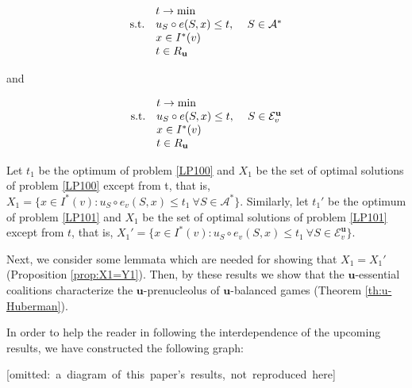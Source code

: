\documentclass[a4paper,12pt]{article}
\theoremstyle{definition}
\theoremstyle{remark}
\begin{document}
\begin{equation}\label{LP100}
\begin{array}{llr}
& t \to \min & \\
\textup{s.t.} & u_S \circ e(S, x) \leq t, & \ S \in \mathcal{A}^\ast \\
& x \in I^\ast (v) &  \\
& t \in R_{\mathbf{u}} & 
\end{array}
\end{equation}

\noindent and

\begin{equation}\label{LP101}
\begin{array}{llr}
& t \to \min & \\
\textup{s.t.} & u_S \circ e(S, x) \leq t, & \ S \in \mathcal{E}_v^\mathbf{u} \\
& x \in I^\ast (v) &  \\
& t \in R_{\mathbf{u}} & 
\end{array}
\end{equation}

Let $t_1$ be the optimum of problem \eqref{LP100} and $X_1$ be the set of optimal solutions of problem \eqref{LP100} except from t, that is, $X_1 = \{x\in I^\ast (v) \colon u_S \circ e_v (S,x) \leq t_1 \ \forall S\in \mathcal{A}^\ast \}$. Similarly, let $t_1'$ be the optimum of problem \eqref{LP101} and $X_1$ be the set of optimal solutions of problem \eqref{LP101} except from $t$, that is, $X_1' = \{x\in I^\ast (v) \colon u_S \circ e_v (S,x) \leq t_1 \ \forall S\in \mathcal{E}^\mathbf{u}_v \}$.
 

Next, we consider some lemmata which are needed for showing that $X_1 = X_1'$ (Proposition \ref{prop:X1=Y1}). Then, by these results we show that the $\mathbf{u}$-essential coalitions characterize the $\mathbf{u}$-prenucleolus of $\mathbf{u}$-balanced games (Theorem \ref{th:u-Huberman}). 

In order to help the reader in following the interdependence of the upcoming results, we have constructed the following graph:  %

\bigskip

\mbox{[omitted: a diagram of this paper's results, not reproduced here]}
\end{document}
